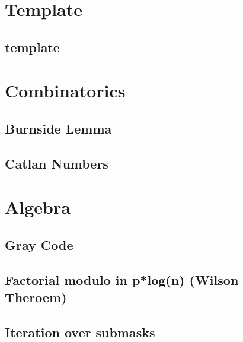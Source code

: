 \section{Template}
\subsection{template}
\vspace{-2ex}
\raggedbottom
\vspace{-3.2ex}
\hrulefill

\section{Combinatorics}
\subsection{Burnside Lemma}
\vspace{-2ex}
\raggedbottom
\vspace{-3.2ex}
\hrulefill
\subsection{Catlan Numbers}
\vspace{-2ex}
\raggedbottom
\vspace{-3.2ex}
\hrulefill

\section{Algebra}
\subsection{Gray Code}
\vspace{-2ex}
\raggedbottom
\vspace{-3.2ex}
\hrulefill
\subsection{Factorial modulo in p*log(n) (Wilson Theroem)}
\vspace{-2ex}
\raggedbottom
\vspace{-3.2ex}
\hrulefill
\subsection{Iteration over submasks}
\vspace{-2ex}
\raggedbottom
\vspace{-3.2ex}
\hrulefill
